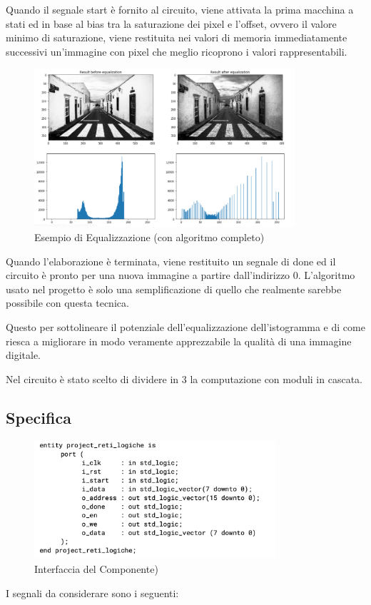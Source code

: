 \documentclass{article}
\begin{document}
Quando il segnale start è fornito al circuito, viene attivata la prima macchina a stati ed in base al bias tra la saturazione dei pixel e l'offset, ovvero il valore minimo di saturazione, viene restituita nei valori di memoria immediatamente successivi un'immagine con pixel che meglio ricoprono i valori rappresentabili.
\begin{figure}[hbt!]
\centering
\includegraphics[width=0.86\textwidth]{Example.png}
\caption{Esempio di Equalizzazione (con algoritmo completo)}
\end{figure}

Quando l'elaborazione è terminata, viene restituito un segnale di done ed il circuito è pronto per una nuova immagine a partire dall'indirizzo 0. L'algoritmo usato nel progetto è solo una semplificazione di quello che realmente sarebbe possibile con questa tecnica. 

Questo per sottolineare il potenziale dell'equalizzazione dell'istogramma e di come riesca a migliorare in modo veramente apprezzabile la qualità di una immagine digitale.

Nel circuito è stato scelto di dividere in 3 la computazione con moduli in cascata.
\subsection{Specifica}
 \begin{figure}[h]
\centering
\includegraphics[width=0.8\textwidth]{segnali.png}
\caption{Interfaccia del Componente)}
\end{figure}
I segnali da considerare sono i seguenti:
\newline
\end{document}
